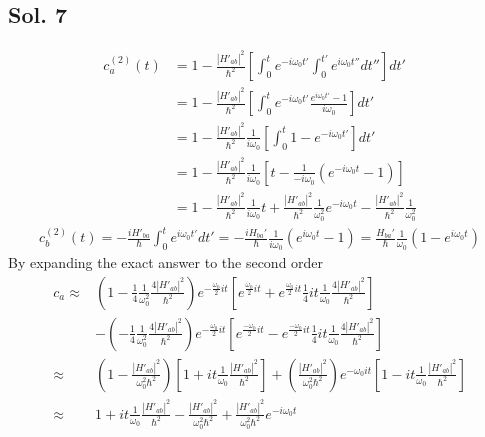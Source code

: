 \subsection*{Sol. 7}
\begin{align*}
    c_a^{(2)}(t) & =
    1
    -\frac{|H'_{ab}|^2}{\hbar^2}
    \left[
        \int_{0}^{t}
        e^{-i\omega_0 t'}
        \int_{0}^{t'} e^{i\omega_0 t''}dt''
        \right]dt' \\
                 & =
    1
    -\frac{|H'_{ab}|^2}{\hbar^2}
    \left[
        \int_{0}^{t}
        e^{-i\omega_0 t'}
        \frac{e^{i\omega_0t'}-1}{i\omega_0}
        \right]dt' \\
                 & =
    1
    -\frac{|H'_{ab}|^2}{\hbar^2}\frac{1}{i\omega_0}
    \left[
        \int_{0}^{t}
        1
        -e^{-i\omega_0 t'}
        \right]dt' \\
                 & =
    1
    -\frac{|H'_{ab}|^2}{\hbar^2}\frac{1}{i\omega_0}
    \left[
        t - \frac{1}{-i\omega_0}(e^{-i\omega_0 t}-1)
        \right] \\
                 & = 1- \frac{|H'_{ab}|^2}{\hbar^2}\frac{1}{i\omega_0}t
    +
    \frac{|H'_{ab}|^2}{\hbar^2}\frac{1}{\omega^2_0}
    e^{-i\omega_0 t}-
    \frac{|H'_{ab}|^2}{\hbar^2}\frac{1}{\omega^2_0}
\end{align*}
\begin{align*}
    c_b^{(2)}(t) =
    -\frac{iH'_{ba}}{\hbar}
    \int_0^{t}
    e^{i\omega_0 t'}dt'
    =
    -\frac{iH_{ba}'}{\hbar}\frac{1}{i\omega_0}(e^{i\omega_0 t}-1)
    =
    \frac{H_{ba}'}{\hbar}\frac{1}{\omega_0}(1-e^{i\omega_0 t})
\end{align*}
By expanding the exact answer to the second order
\begin{align*}
    c_a \approx & \left(1 - \frac{1}{4}\frac{1}{\omega_0^2}\frac{4|H'_{ab}|^2}{\hbar^2}\right)e^{-\frac{\omega_0}{2}it}
    \left[e^{\frac{\omega_0}{2}it}
        +e^{\frac{\omega_0}{2}it}\frac{1}{4}it\frac{1}{\omega_0}\frac{4|H'_{ab}|^2}{\hbar^2}\right] \\
                & -\left(-\frac{1}{4}\frac{1}{\omega_0^2}
    \frac{4|H'_{ab}|^2}{\hbar^2}\right)e^{-\frac{\omega_0}{2}it}
    \left[e^{\frac{-\omega_0}{2}it}
        -e^{\frac{-\omega_0}{2}it}\frac{1}{4}it\frac{1}{\omega_0}\frac{4|H'_{ab}|^2}{\hbar^2}\right] \\
    \approx     & \left(1 - \frac{|H'_{ab}|^2}{\omega_0^2\hbar^2}\right)
    \left[1
        +it\frac{1}{\omega_0}\frac{|H'_{ab}|^2}{\hbar^2}\right]  +\left(\frac{|H'_{ab}|^2}{\omega_0^2\hbar^2}\right)e^{-\omega_0it}
    \left[1
        -it\frac{1}{\omega_0}\frac{|H'_{ab}|^2}{\hbar^2}\right] \\
    \approx     &
    1+it\frac{1}{\omega_0}\frac{|H'_{ab}|^2}{\hbar^2}
    -\frac{|H'_{ab}|^2}{\omega_0^2\hbar^2}
    +\frac{|H'_{ab}|^2}{\omega_0^2\hbar^2}e^{-i\omega_0 t}
\end{align*}

